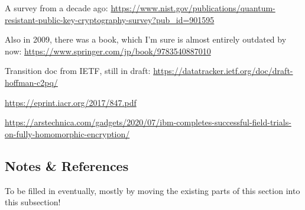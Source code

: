 A survey from a decade ago:
\url{https://www.nist.gov/publications/quantum-resistant-public-key-cryptography-survey?pub_id=901595}

Also in 2009, there was a book, which I'm sure is almost entirely
outdated by now:
\url{https://www.springer.com/jp/book/9783540887010}

Transition doc from IETF, still in draft:
\url{https://datatracker.ietf.org/doc/draft-hoffman-c2pq/}

\url{https://eprint.iacr.org/2017/847.pdf}

\url{https://arstechnica.com/gadgets/2020/07/ibm-completes-successful-field-trials-on-fully-homomorphic-encryption/}

\subsection{Notes \& References}

To be filled in eventually, mostly by moving the existing parts of
this section into this subsection!



